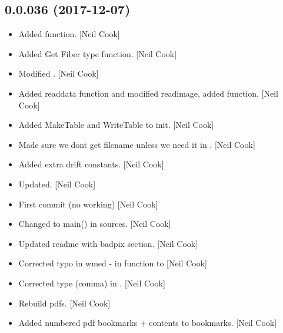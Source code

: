 \documentclass[a4paper,10pt,english]{report}
\begin{document}
\subsection{0.0.036 (2017-12-07)}
\label{\detokenize{misc/changelog:id515}}\begin{itemize}
\item {} 
Added  function. {[}Neil Cook{]}

\item {} 
Added Get Fiber type function. {[}Neil Cook{]}

\item {} 
Modified . {[}Neil Cook{]}

\item {} 
Added readdata function and modified readimage, added 
function. {[}Neil Cook{]}

\item {} 
Added MakeTable and WriteTable to init. {[}Neil Cook{]}

\item {} 
Made sure we dont get filename unless we need it in
. {[}Neil Cook{]}

\item {} 
Added extra drift constants. {[}Neil Cook{]}

\item {} 
Updated. {[}Neil Cook{]}

\item {} 
First commit (no working) {[}Neil Cook{]}

\item {} 
Changed  to main() in sources. {[}Neil Cook{]}

\item {} 
Updated readme with badpix section. {[}Neil Cook{]}

\item {} 
Corrected typo in wmed - in  function
 to  {[}Neil Cook{]}

\item {} 
Corrected type (comma) in . {[}Neil Cook{]}

\item {} 
Rebuild pdfs. {[}Neil Cook{]}

\item {} 
Added numbered pdf bookmarks + contents to bookmarks. {[}Neil Cook{]}


\end{itemize}
\end{document}
